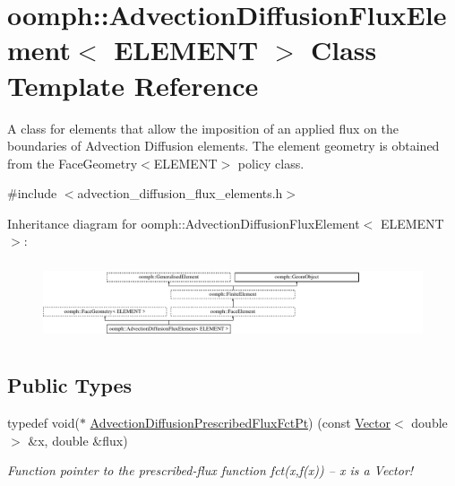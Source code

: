 \hypertarget{classoomph_1_1AdvectionDiffusionFluxElement}{}\section{oomph\+:\+:Advection\+Diffusion\+Flux\+Element$<$ E\+L\+E\+M\+E\+NT $>$ Class Template Reference}
\label{classoomph_1_1AdvectionDiffusionFluxElement}


A class for elements that allow the imposition of an applied flux on the boundaries of Advection Diffusion elements. The element geometry is obtained from the Face\+Geometry$<$\+E\+L\+E\+M\+E\+N\+T$>$ policy class.  




{\ttfamily \#include $<$advection\+\_\+diffusion\+\_\+flux\+\_\+elements.\+h$>$}

Inheritance diagram for oomph\+:\+:Advection\+Diffusion\+Flux\+Element$<$ E\+L\+E\+M\+E\+NT $>$\+:\begin{figure}[H]
\begin{center}
\leavevmode
\includegraphics[height=2.333333cm]{classoomph_1_1AdvectionDiffusionFluxElement}
\end{center}
\end{figure}
\subsection*{Public Types}
\begin{DoxyCompactItemize}
\item 
typedef void($\ast$ \hyperlink{classoomph_1_1AdvectionDiffusionFluxElement_aeb9eb0a65d6dfe3673f6910a6fd7cf59}{Advection\+Diffusion\+Prescribed\+Flux\+Fct\+Pt}) (const \hyperlink{classoomph_1_1Vector}{Vector}$<$ double $>$ \&x, double \&flux)
\begin{DoxyCompactList}\small\item\em Function pointer to the prescribed-\/flux function fct(x,f(x)) -- x is a Vector! \end{DoxyCompactList}\end{DoxyCompactItemize}
